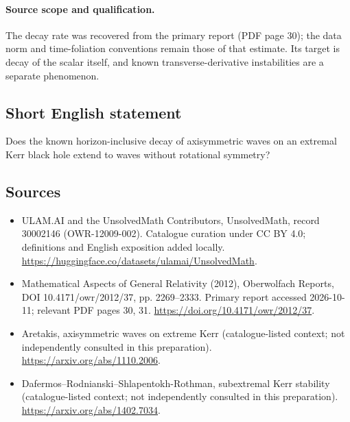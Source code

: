 \documentclass[11pt]{article}
\begin{document}
\paragraph{Source scope and qualification.}
The decay rate was recovered from the primary report (PDF page 30); the data norm and time-foliation conventions remain those of that estimate. Its target is decay of the scalar itself, and known transverse-derivative instabilities are a separate phenomenon.
\subsection{Short English statement}
Does the known horizon-inclusive decay of axisymmetric waves on an extremal Kerr black hole extend to waves without rotational symmetry?
\subsection{Sources}
\begin{itemize}
\item[\hypertarget{source:30002146:1}{S1}] ULAM.AI and the UnsolvedMath Contributors, UnsolvedMath, record 30002146 (OWR-12009-002). Catalogue curation under CC BY 4.0; definitions and English exposition added locally.
\url{https://huggingface.co/datasets/ulamai/UnsolvedMath}.
\item[\hypertarget{source:30002146:2}{S2}] Mathematical Aspects of General Relativity (2012), Oberwolfach Reports, DOI 10.4171/owr/2012/37, pp. 2269--2333. Primary report accessed 2026-10-11; relevant PDF pages 30, 31.
\url{https://doi.org/10.4171/owr/2012/37}.
\item[\hypertarget{source:30002146:3}{S3}] Aretakis, axisymmetric waves on extreme Kerr (catalogue-listed context; not independently consulted in this preparation).
\url{https://arxiv.org/abs/1110.2006}.
\item[\hypertarget{source:30002146:4}{S4}] Dafermos--Rodnianski--Shlapentokh-Rothman, subextremal Kerr stability (catalogue-listed context; not independently consulted in this preparation).
\url{https://arxiv.org/abs/1402.7034}.
\end{itemize}
\label{end:30002146}
\end{document}

